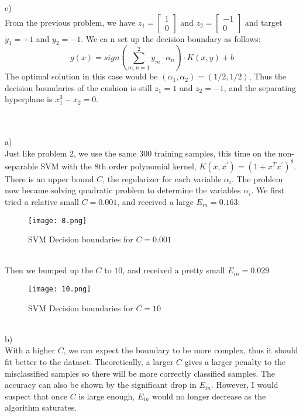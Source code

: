 \documentclass[12pt]{article}
\newcommand{\D}{\displaystyle}
\begin{document}
e)\\
\indent From the previous problem, we have $\D z_1 = \begin{bmatrix} 1\\0 \end{bmatrix}$ and $\D z_2 = \begin{bmatrix} -1\\0 \end{bmatrix}$ and target $y_1 = +1$ and $y_2 = -1$. We ca n set up the decision boundary as follows: $$\D g(x) = sign(\sum_{m,n=1}^{2} y_m\cdot \alpha_n) \cdot K(x,y) +b$$ \indent The optimal solution in this case would be $(\alpha_1, \alpha_2 )= (1/2, 1/2)$, Thus the decision boundaries of the cushion is still $z_1 = 1$ and $z_2 = -1$, and the separating hyperplane is $x_1^3 - x_2 =0$.

\newpage
{} \\\\
a)\\
\indent Just like problem 2, we use the same 300 training samples, this time on the non-separable SVM with the 8th order polynomial kernel, $K(x,x^{'}) = (1+x^Tx^{'})^8$. There is an upper bound $C$, the regularizer for each variable $\alpha_i$. The problem now became solving quadratic problem to determine the variables $\alpha_i$. We first tried a relative small $C = 0.001$, and received a large $E_{in} = 0.163$:
\begin{figure}[H]
  \centering
  \texttt{[image: 8.png]}
  \caption{SVM Decision boundaries for $C = 0.001$}
  \label{fig:1}
\end{figure}\indent\\
\indent Then we bumped up the $C$ to $10$, and received a pretty small $E_{in} = 0.029$
\begin{figure}[H]
  \centering
  \texttt{[image: 10.png]}
  \caption{SVM Decision boundaries for $C = 10$}
  \label{fig:1}
\end{figure}\indent\\
b)\\
\indent With a higher $C$, we can expect the boundary to be more complex, thus it should fit better to the dataset. Theoretically, a larger $C$ gives a larger penalty to the misclassified samples so there will be more correctly classified samples. The accuracy can also be shown by the significant drop in $E_{in}$. However, I would suspect that once $C$ is large enough, $E_{in}$ would no longer decrease as the algorithm saturates.\\
\end{document}
